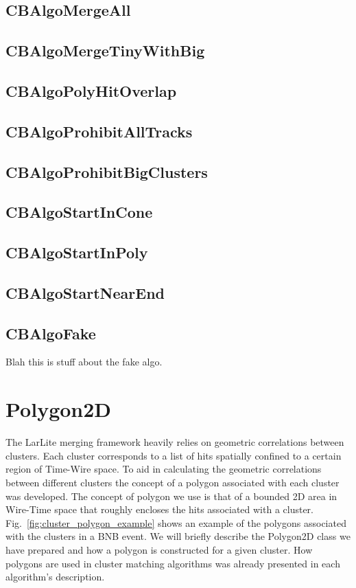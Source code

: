 \documentclass{article}
\begin{document}
\subsection{CBAlgoMergeAll}\label{sec:CBAlgoMergeAll}
\subsection{CBAlgoMergeTinyWithBig}\label{sec:CBAlgoMergeTinyWithBig}
\subsection{CBAlgoPolyHitOverlap}\label{sec:CBAlgoPolyHitOverlap}
\subsection{CBAlgoProhibitAllTracks}\label{sec:CBAlgoProhibitAllTracks}
\subsection{CBAlgoProhibitBigClusters}\label{sec:CBAlgoProhibitBigClusters}
\subsection{CBAlgoStartInCone}\label{sec:CBAlgoStartInCone}
\subsection{CBAlgoStartInPoly}\label{sec:CBAlgoStartInPoly}
\subsection{CBAlgoStartNearEnd}\label{sec:CBAlgoStartNearEnd}


\subsection{CBAlgoFake}
\label{sec:CBAlgoFake}
Blah this is stuff about the fake algo.


\newpage

\appendix

\section{Polygon2D}

The LarLite merging framework heavily relies on geometric correlations between clusters. Each cluster corresponds 
to a list of hits spatially confined to a certain region of Time-Wire space. To aid in calculating the geometric 
correlations between different clusters the concept of a polygon associated with each cluster was developed. 
The concept of polygon we use is that of a bounded 2D area in Wire-Time space that roughly encloses the hits associated
with a cluster. Fig.~\ref{fig:cluster_polygon_example} shows an example of the polygons associated with the clusters
in a BNB event.
We will briefly describe the Polygon2D class we have prepared and how a polygon is constructed for a given
cluster. How polygons are used in cluster matching algorithms was already presented in each algorithm's description.
\end{document}
